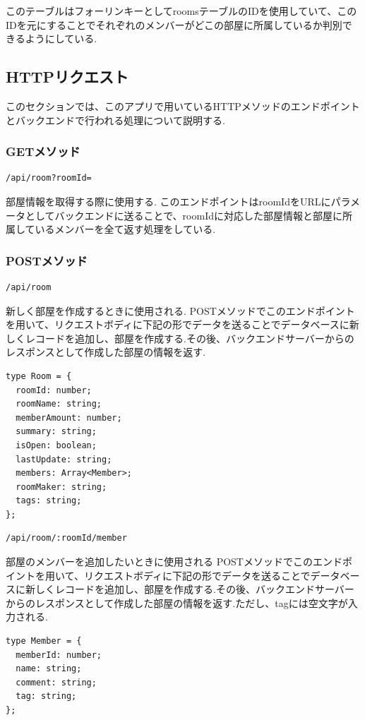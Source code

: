 \documentclass[submit,techrep]{ipsj}
\begin{document}
このテーブルはフォーリンキーとしてroomsテーブルのIDを使用していて、このIDを元にすることでそれぞれのメンバーがどこの部屋に所属しているか判別できるようにしている.

\subsection{HTTPリクエスト}
このセクションでは、このアプリで用いているHTTPメソッドのエンドポイントとバックエンドで行われる処理について説明する.
\subsubsection{GETメソッド}
\begin{verbatim}
/api/room?roomId=
\end{verbatim}
部屋情報を取得する際に使用する.
このエンドポイントはroomIdをURLにパラメータとしてバックエンドに送ることで、roomIdに対応した部屋情報と部屋に所属しているメンバーを全て返す処理をしている.


\subsubsection{POSTメソッド}
\begin{verbatim}
/api/room
\end{verbatim}
新しく部屋を作成するときに使用される.
POSTメソッドでこのエンドポイントを用いて、リクエストボディに下記の形でデータを送ることでデータベースに新しくレコードを追加し、部屋を作成する.その後、バックエンドサーバーからのレスポンスとして作成した部屋の情報を返す.

\begin{verbatim}
type Room = {
  roomId: number;
  roomName: string;
  memberAmount: number;
  summary: string;
  isOpen: boolean;
  lastUpdate: string;
  members: Array<Member>;
  roomMaker: string;
  tags: string;
};
\end{verbatim}

\begin{verbatim}
/api/room/:roomId/member
\end{verbatim}
部屋のメンバーを追加したいときに使用される
POSTメソッドでこのエンドポイントを用いて、リクエストボディに下記の形でデータを送ることでデータベースに新しくレコードを追加し、部屋を作成する.その後、バックエンドサーバーからのレスポンスとして作成した部屋の情報を返す.ただし、tagには空文字が入力される.
\begin{verbatim}
type Member = {
  memberId: number;
  name: string;
  comment: string;
  tag: string;
};
\end{verbatim}
\end{document}
